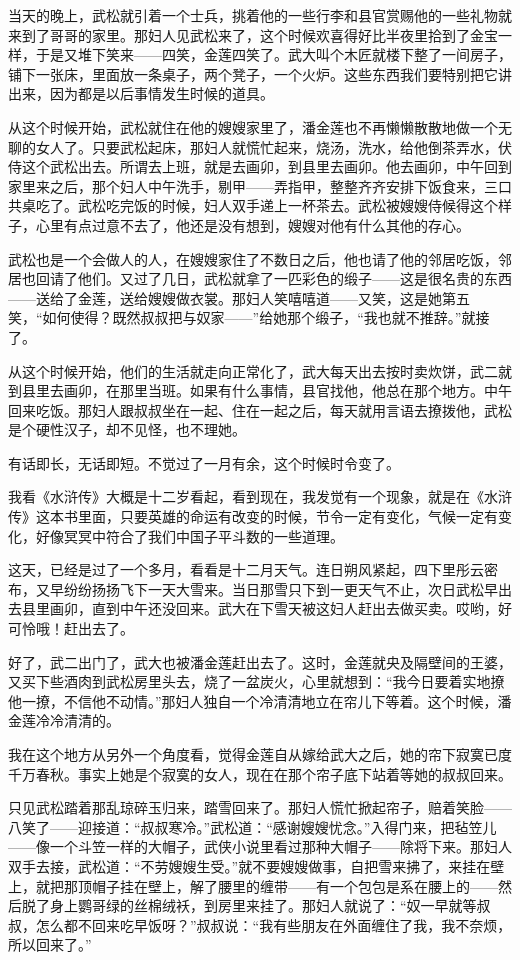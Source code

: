\par 当天的晚上，武松就引着一个士兵，挑着他的一些行李和县官赏赐他的一些礼物就来到了哥哥的家里。那妇人见武松来了，这个时候欢喜得好比半夜里拾到了金宝一样，于是又堆下笑来——四笑，金莲四笑了。武大叫个木匠就楼下整了一间房子，铺下一张床，里面放一条桌子，两个凳子，一个火炉。这些东西我们要特别把它讲出来，因为都是以后事情发生时候的道具。
\par 从这个时候开始，武松就住在他的嫂嫂家里了，潘金莲也不再懒懒散散地做一个无聊的女人了。只要武松起床，那妇人就慌忙起来，烧汤，洗水，给他倒茶弄水，伏侍这个武松出去。所谓去上班，就是去画卯，到县里去画卯。他去画卯，中午回到家里来之后，那个妇人中午洗手，剔甲——弄指甲，整整齐齐安排下饭食来，三口共桌吃了。武松吃完饭的时候，妇人双手递上一杯茶去。武松被嫂嫂侍候得这个样子，心里有点过意不去了，他还是没有想到，嫂嫂对他有什么其他的存心。
\par 武松也是一个会做人的人，在嫂嫂家住了不数日之后，他也请了他的邻居吃饭，邻居也回请了他们。又过了几日，武松就拿了一匹彩色的缎子——这是很名贵的东西——送给了金莲，送给嫂嫂做衣裳。那妇人笑嘻嘻道——又笑，这是她第五笑，“如何使得？既然叔叔把与奴家——”给她那个缎子，“我也就不推辞。”就接了。
\par 从这个时候开始，他们的生活就走向正常化了，武大每天出去按时卖炊饼，武二就到县里去画卯，在那里当班。如果有什么事情，县官找他，他总在那个地方。中午回来吃饭。那妇人跟叔叔坐在一起、住在一起之后，每天就用言语去撩拨他，武松是个硬性汉子，却不见怪，也不理她。
\par 有话即长，无话即短。不觉过了一月有余，这个时候时令变了。
\par 我看《水浒传》大概是十二岁看起，看到现在，我发觉有一个现象，就是在《水浒传》这本书里面，只要英雄的命运有改变的时候，节令一定有变化，气候一定有变化，好像冥冥中符合了我们中国子平斗数的一些道理。
\par 这天，已经是过了一个多月，看看是十二月天气。连日朔风紧起，四下里彤云密布，又早纷纷扬扬飞下一天大雪来。当日那雪只下到一更天气不止，次日武松早出去县里画卯，直到中午还没回来。武大在下雪天被这妇人赶出去做买卖。哎哟，好可怜哦！赶出去了。
\par 好了，武二出门了，武大也被潘金莲赶出去了。这时，金莲就央及隔壁间的王婆，又买下些酒肉到武松房里头去，烧了一盆炭火，心里就想到：“我今日要着实地撩他一撩，不信他不动情。”那妇人独自一个冷清清地立在帘儿下等着。这个时候，潘金莲冷冷清清的。
\par 我在这个地方从另外一个角度看，觉得金莲自从嫁给武大之后，她的帘下寂寞已度千万春秋。事实上她是个寂寞的女人，现在在那个帘子底下站着等她的叔叔回来。
\par 只见武松踏着那乱琼碎玉归来，踏雪回来了。那妇人慌忙掀起帘子，赔着笑脸——八笑了——迎接道：“叔叔寒冷。”武松道：“感谢嫂嫂忧念。”入得门来，把毡笠儿——像一个斗笠一样的大帽子，武侠小说里看过那种大帽子——除将下来。那妇人双手去接，武松道：“不劳嫂嫂生受。”就不要嫂嫂做事，自把雪来拂了，来挂在壁上，就把那顶帽子挂在壁上，解了腰里的缠带——有一个包包是系在腰上的——然后脱了身上鹦哥绿的丝棉绒袄，到房里来挂了。那妇人就说了：“奴一早就等叔叔，怎么都不回来吃早饭呀？”叔叔说：“我有些朋友在外面缠住了我，我不奈烦，所以回来了。”

